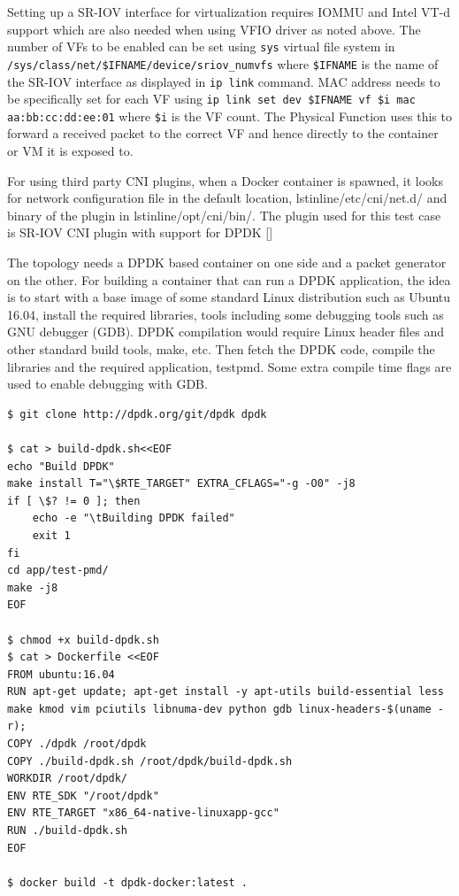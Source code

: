 \documentclass[english, 12pt, a4paper, elec, utf8, a-1b, online]{aaltothesis}
\begin{document}
Setting up a SR-IOV interface for virtualization requires IOMMU and Intel VT-d support which are also needed when using VFIO driver as noted above. The number of VFs to be enabled can be set using \lstinline{sys} virtual file system in 
\lstinline{/sys/class/net/$IFNAME/device/sriov_numvfs} where \lstinline{$IFNAME} is the name of the SR-IOV interface as displayed in \lstinline{ip link} command. MAC address needs to be specifically set for each VF using \lstinline{ip link set dev $IFNAME vf $i mac aa:bb:cc:dd:ee:01} where \lstinline{$i} is the VF count. The Physical Function uses this to forward a received packet to the correct VF and hence directly to the container or VM it is exposed to.

For using third party CNI plugins, when a Docker container is spawned, it looks for network configuration file in the default location, lstinline{/etc/cni/net.d/} and binary of the plugin in lstinline{/opt/cni/bin/}. The plugin used for this test case is SR-IOV CNI plugin with support for DPDK []

The topology needs a DPDK based container on one side and a packet generator on the other. For building a container that can run a DPDK application, the idea is to start with a base image of some standard Linux distribution such as Ubuntu 16.04, install the required libraries, tools including some debugging tools such as GNU debugger (GDB). DPDK compilation would require Linux header files and other standard build tools, make, etc. Then fetch the DPDK code, compile the libraries and the required application, testpmd. Some extra compile time flags are used to enable debugging with GDB.

\begin{lstlisting}[basicstyle={\small\ttfamily}]
$ git clone http://dpdk.org/git/dpdk dpdk

$ cat > build-dpdk.sh<<EOF
echo "Build DPDK"
make install T="\$RTE_TARGET" EXTRA_CFLAGS="-g -O0" -j8
if [ \$? != 0 ]; then
    echo -e "\tBuilding DPDK failed"
    exit 1
fi
cd app/test-pmd/
make -j8
EOF

$ chmod +x build-dpdk.sh
$ cat > Dockerfile <<EOF
FROM ubuntu:16.04
RUN apt-get update; apt-get install -y apt-utils build-essential less make kmod vim pciutils libnuma-dev python gdb linux-headers-$(uname -r);
COPY ./dpdk /root/dpdk
COPY ./build-dpdk.sh /root/dpdk/build-dpdk.sh
WORKDIR /root/dpdk/
ENV RTE_SDK "/root/dpdk"
ENV RTE_TARGET "x86_64-native-linuxapp-gcc"
RUN ./build-dpdk.sh
EOF

$ docker build -t dpdk-docker:latest .
\end{lstlisting}
\end{document}
